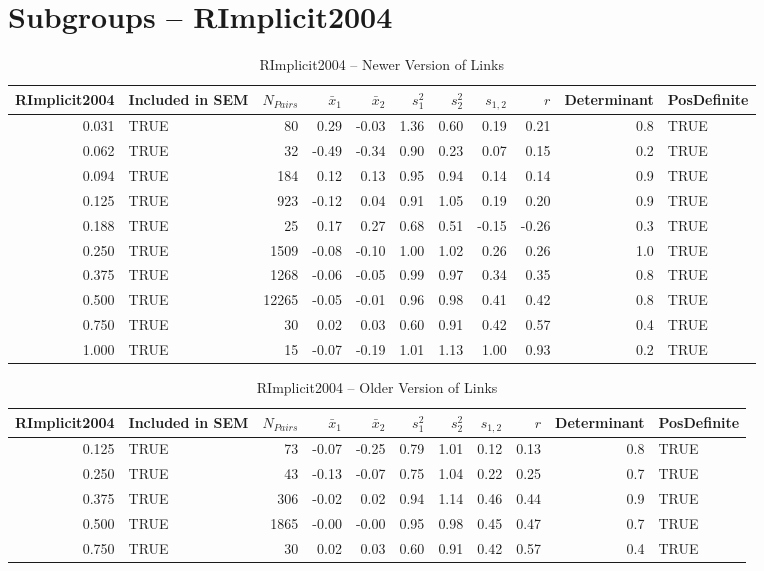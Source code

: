 \documentclass{article}\usepackage[]{graphicx}\usepackage[]{color}
\begin{document}
\section{Subgroups --  RImplicit2004 }%
\begin{table}[ht]
\centering
\begin{tabular}{rlrrrrrrrrl}
  \hline
RImplicit2004 & Included in SEM & $N_{Pairs}$ & $\bar{x}_1$ & $\bar{x}_2$ & $s_1^2$ & $s_2^2$ & $s_{1,2}$ & $r$ & Determinant & PosDefinite \\ 
  \hline
0.031 & TRUE & 80 & 0.29 & -0.03 & 1.36 & 0.60 & 0.19 & 0.21 & 0.8 & TRUE \\ 
  0.062 & TRUE & 32 & -0.49 & -0.34 & 0.90 & 0.23 & 0.07 & 0.15 & 0.2 & TRUE \\ 
  0.094 & TRUE & 184 & 0.12 & 0.13 & 0.95 & 0.94 & 0.14 & 0.14 & 0.9 & TRUE \\ 
  0.125 & TRUE & 923 & -0.12 & 0.04 & 0.91 & 1.05 & 0.19 & 0.20 & 0.9 & TRUE \\ 
  0.188 & TRUE & 25 & 0.17 & 0.27 & 0.68 & 0.51 & -0.15 & -0.26 & 0.3 & TRUE \\ 
  0.250 & TRUE & 1509 & -0.08 & -0.10 & 1.00 & 1.02 & 0.26 & 0.26 & 1.0 & TRUE \\ 
  0.375 & TRUE & 1268 & -0.06 & -0.05 & 0.99 & 0.97 & 0.34 & 0.35 & 0.8 & TRUE \\ 
  0.500 & TRUE & 12265 & -0.05 & -0.01 & 0.96 & 0.98 & 0.41 & 0.42 & 0.8 & TRUE \\ 
  0.750 & TRUE & 30 & 0.02 & 0.03 & 0.60 & 0.91 & 0.42 & 0.57 & 0.4 & TRUE \\ 
  1.000 & TRUE & 15 & -0.07 & -0.19 & 1.01 & 1.13 & 1.00 & 0.93 & 0.2 & TRUE \\ 
   \hline
\end{tabular}
\caption{RImplicit2004 -- Newer Version of Links} 
\end{table}
\begin{table}[ht]
\centering
\begin{tabular}{rlrrrrrrrrl}
  \hline
RImplicit2004 & Included in SEM & $N_{Pairs}$ & $\bar{x}_1$ & $\bar{x}_2$ & $s_1^2$ & $s_2^2$ & $s_{1,2}$ & $r$ & Determinant & PosDefinite \\ 
  \hline
0.125 & TRUE & 73 & -0.07 & -0.25 & 0.79 & 1.01 & 0.12 & 0.13 & 0.8 & TRUE \\ 
  0.250 & TRUE & 43 & -0.13 & -0.07 & 0.75 & 1.04 & 0.22 & 0.25 & 0.7 & TRUE \\ 
  0.375 & TRUE & 306 & -0.02 & 0.02 & 0.94 & 1.14 & 0.46 & 0.44 & 0.9 & TRUE \\ 
  0.500 & TRUE & 1865 & -0.00 & -0.00 & 0.95 & 0.98 & 0.45 & 0.47 & 0.7 & TRUE \\ 
  0.750 & TRUE & 30 & 0.02 & 0.03 & 0.60 & 0.91 & 0.42 & 0.57 & 0.4 & TRUE \\ 
   \hline
\end{tabular}
\caption{RImplicit2004 -- Older Version of Links} 
\end{table}
\end{document}
